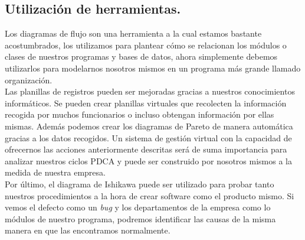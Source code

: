 \documentclass[spanish, fleqn]{article}
\begin{document}
	\subsection{Utilización de herramientas.}
	Los diagramas de flujo son una herramienta a la cual estamos bastante 
	acostumbrados, los utilizamos para plantear cómo se relacionan los módulos
	o clases de nuestros programas y bases de datos, ahora simplemente debemos
	utilizarlos para modelarnos nosotros mismos en un programa más grande 
	llamado organización.\\
	Las planillas de registros pueden ser mejoradas gracias a nuestros 
	conocimientos informáticos. Se pueden crear planillas virtuales que 
	recolecten la información recogida por muchos funcionarios o incluso
	obtengan información por ellas mismas. Además podemos crear los diagramas
	de Pareto de manera automática gracias a los datos recogidos. Un sistema 
	de gestión virtual con la capacidad de ofrecernos las acciones anteriormente
	descritas será de suma importancia para analizar nuestros ciclos PDCA y 
	puede ser construido por nosotros mismos a la medida de nuestra empresa.\\
	Por último, el diagrama de Ishikawa puede ser utilizado para probar tanto 
	nuestros procedimientos a la hora de crear software como el producto mismo.
	Si vemos el defecto como un \emph{bug} y los departamentos de la empresa
	como lo módulos de nuestro programa, podremos identificar las causas de la
	misma manera en que las encontramos normalmente.
\end{document}
